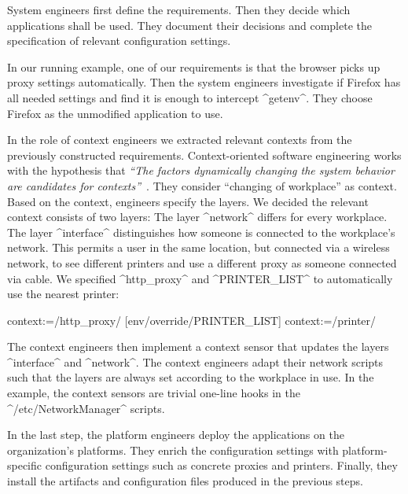 System engineers first define the requirements.
Then they decide which applications shall be used.
They document their decisions and complete the specification of relevant configuration settings.

In our running example, one of our requirements is that the browser picks up proxy settings automatically.
Then the system engineers investigate if Firefox has all needed settings and find it is enough to intercept ^getenv^.
They choose Firefox as the unmodified application to use.

In the role of context engineers we extracted relevant contexts from the previously constructed requirements.
Context-oriented software engineering works with the hypothesis that \emph{``The factors dynamically changing the system behavior are candidates for contexts''}~\cite{kamina2014context}.
They consider ``changing of workplace'' as context.
Based on the context, engineers specify the layers.
We decided the relevant context consists of two layers:
The layer ^network^ differs for every workplace.
The layer ^interface^ distinguishes how someone is connected to the workplace's network.
This permits a user in the same location, but connected via a wireless network, to see different printers and use a different proxy as someone connected via cable.
We specified ^http_proxy^ and ^PRINTER_LIST^ to automatically use the nearest printer:

\begin{code}
  context:=/http_proxy/%
[env/override/PRINTER_LIST]
  context:=/printer/%
\end{code}

The context engineers then implement a context sensor that updates the layers ^interface^ and ^network^.
The context engineers adapt their network scripts such that the layers are always set according to the workplace in use.
In the example, the context sensors are trivial one-line hooks in the ^/etc/NetworkManager^ scripts.

In the last step, the platform engineers deploy the applications on the organization's platforms.
They enrich the configuration settings with platform-specific configuration settings such as concrete proxies and printers.
Finally, they install the artifacts and configuration files produced in the previous steps.


